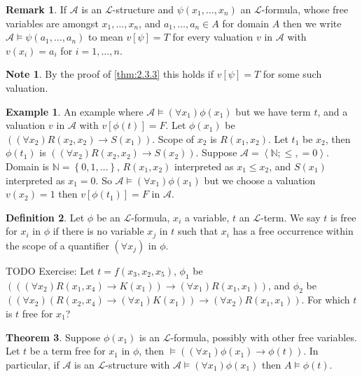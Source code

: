 \documentclass{article}
\newcommand{\N}{\mathbb{N}}
\newcommand{\A}{\mathcal{A}}
\renewcommand{\L}{\mathcal{L}}
\newcommand{\rb}[1]{\left( #1 \right)}
\renewcommand{\sb}[1]{\left[ #1 \right]}
\newcommand{\cb}[1]{\left\{ #1 \right\}}
\newcommand{\ab}[1]{\left\langle #1 \right\rangle}
\newcommand{\impb}[2]{\rb{#1 \rightarrow #2}}
\newcommand{\fab}[1]{\rb{\forall #1}}
\theoremstyle{definition}\newtheorem{definition}{Definition}[subsection]
\theoremstyle{definition}\newtheorem{remark}[definition]{Remark}
\theoremstyle{definition}\newtheorem*{example}{Example}
\theoremstyle{definition}\newtheorem*{note}{Note}
\newtheorem{theorem}[definition]{Theorem}
\begin{document}

\begin{remark}
If $ \A $ is an $ \L $-structure and $ \psi\rb{x_1, \dots, x_n} $ an $ \L $-formula, whose free variables are amongst $ x_1, \dots, x_n $, and $ a_1, \dots, a_n \in A $ for domain $ A $ then we write $ \A \vDash \psi\rb{a_1, \dots, a_n} $ to mean $ v\sb{\psi} = T $ for every valuation $ v $ in $ \A $ with $ v\rb{x_i} = a_i $ for $ i = 1, \dots, n $.
\end{remark}

\begin{note}
By the proof of \ref{thm:2.3.3} this holds if $ v\sb{\psi} = T $ for some such valuation.
\end{note}

\begin{example}
An example where $ \A \vDash \fab{x_1}\phi\rb{x_1} $ but we have term $ t $, and a valuation $ v $ in $ \A $ with $ v\sb{\phi\rb{t}} = F $. Let $ \phi\rb{x_1} $ be $ \impb{\fab{x_2}R\rb{x_2, x_2}}{S\rb{x_1}} $. Scope of $ x_2 $ is $ R\rb{x_1, x_2} $. Let $ t_1 $ be $ x_2 $, then $ \phi\rb{t_1} $ is $ \impb{\fab{x_2}R\rb{x_2, x_2}}{S\rb{x_2}} $. Suppose $ \A = \ab{\N; \le, = 0} $. Domain is $ \N = \cb{0, 1, \dots} $, $ R\rb{x_1, x_2} $ interpreted as $ x_1 \le x_2 $, and $ S\rb{x_1} $ interpreted as $ x_1 = 0 $. So $ \A \vDash \fab{x_1}\phi\rb{x_1} $ but we choose a valuation $ v\rb{x_2} = 1 $ then $ v\sb{\phi\rb{t_1}} = F $ in $ \A $.
\end{example}

\begin{definition}
Let $ \phi $ be an $ \L $-formula, $ x_i $ a variable, $ t $ an $ \L $-term. We say $ t $ is free for $ x_i $ in $ \phi $ if there is no variable $ x_j $ in $ t $ such that $ x_i $ has a free occurrence within the scope of a quantifier $ \fab{x_j} $ in $ \phi $.
\end{definition}

TODO Exercise: Let $ t = f\rb{x_3, x_2, x_5} $, $ \phi_1 $ be $ \impb{\impb{\fab{x_2}R\rb{x_1, x_4}}{K\rb{x_1}}}{\fab{x_1}R\rb{x_1, x_1}} $, and $ \phi_2 $ be $ \impb{\fab{x_2}\impb{R\rb{x_2, x_4}}{\fab{x_1}K\rb{x_1}}}{\fab{x_2}R\rb{x_1, x_1}} $. For which $ t $ is $ t $ free for $ x_1 $?

\begin{theorem}
\label{thm:2.3.6}
Suppose $ \phi\rb{x_1} $ is an $ \L $-formula, possibly with other free variables. Let $ t $ be a term free for $ x_1 $ in $ \phi $, then $ \vDash \impb{\fab{x_1}\phi\rb{x_1}}{\phi\rb{t}} $. In particular, if $ \A $ is an $ \L $-structure with $ \A \vDash \fab{x_1}\phi\rb{x_1} $ then $ A \vDash \phi\rb{t} $.
\end{theorem}
\end{document}
